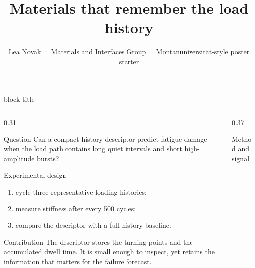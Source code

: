 \documentclass[final]{beamer}
\title{Materials that remember the load history}
\author{Lea Novak · Materials and Interfaces Group · Montanuniversität-style poster starter}
\institute{Example laboratory · replace this line with your affiliation}
\begin{document}
\begin{frame}[t]
\begin{beamercolorbox}[wd=\paperwidth,sep=1.7em,leftskip=2em,rightskip=2em]{block title}
  {\fontsize{43}{50}\selectfont\bfseries\inserttitle}\par\vspace{0.25em}
  {\Large\insertauthor\hfill\insertinstitute}
\end{beamercolorbox}
\vspace{1.2em}
\begin{columns}[t,totalwidth=0.96\paperwidth]
\begin{column}{0.31\paperwidth}
\begin{block}{Question}
  Can a compact history descriptor predict fatigue damage when the load path
  contains long quiet intervals and short high-amplitude bursts?
\end{block}
\begin{block}{Experimental design}
  \begin{enumerate}\itemsep0.5em
    \item cycle three representative loading histories;
    \item measure stiffness after every 500 cycles;
    \item compare the descriptor with a full-history baseline.
  \end{enumerate}
\end{block}
\begin{block}{Contribution}
  The descriptor stores the turning points and the accumulated dwell time. It
  is small enough to inspect, yet retains the information that matters for
  the failure forecast.
\end{block}
\end{column}
\begin{column}{0.37\paperwidth}
\begin{block}{Method and signal}
\centering
{}
\vspace{0.5em}

\end{block}
\end{column}
\end{columns}
\end{frame}
\end{document}
